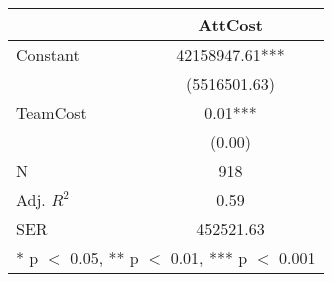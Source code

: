 \begin{table}
\centering
\begin{tabular}[t]{lc}
\toprule
  & AttCost\\
\midrule
Constant & \num{42158947.61}***\\
 & (\num{5516501.63})\\
TeamCost & \num{0.01}***\\
 & (\num{0.00})\\
\midrule
N & \num{918}\\
Adj. $R^2$ & \num{0.59}\\
SER & \num{452521.63}\\
\bottomrule
\multicolumn{2}{l}{\rule{0pt}{1em}* p $<$ 0.05, ** p $<$ 0.01, *** p $<$ 0.001}\\
\end{tabular}
\end{table}

